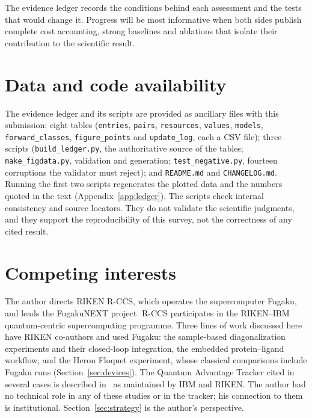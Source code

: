 The evidence ledger records the conditions behind each assessment and the tests that would change it. Progress will be most informative when both sides publish complete cost accounting, strong baselines and ablations that isolate their contribution to the scientific result.

\section*{Data and code availability}
The evidence ledger and its scripts are provided as ancillary files with this submission: eight tables (\texttt{entries}, \texttt{pairs}, \texttt{resources}, \texttt{values}, \texttt{models}, \texttt{forward\_classes}, \texttt{figure\_points} and \texttt{update\_log}, each a CSV file); three scripts (\texttt{build\_ledger.py}, the authoritative source of the tables; \texttt{make\_figdata.py}, validation and generation; \texttt{test\_negative.py}, fourteen corruptions the validator must reject); and \texttt{README.md} and \texttt{CHANGELOG.md}. Running the first two scripts regenerates the plotted data and the numbers quoted in the text (Appendix~\ref{app:ledger}). The scripts check internal consistency and source locators. They do not validate the scientific judgments, and they support the reproducibility of this survey, not the correctness of any cited result.

\section*{Competing interests}
The author directs RIKEN R-CCS, which operates the supercomputer Fugaku, and leads the FugakuNEXT project. R-CCS participates in the RIKEN--IBM quantum-centric supercomputing programme. Three lines of work discussed here have RIKEN co-authors and used Fugaku: the sample-based diagonalization experiments and their closed-loop integration, the embedded protein--ligand workflow, and the Heron Floquet experiment, whose classical comparisons include Fugaku runs (Section~\ref{sec:devices}). The Quantum Advantage Tracker cited in several cases is described in~\cite{legeza2026} as maintained by IBM and RIKEN. The author had no technical role in any of these studies or in the tracker; his connection to them is institutional. Section~\ref{sec:strategy} is the author's perspective.

